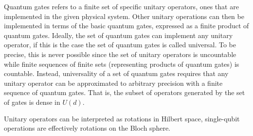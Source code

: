 Quantum gates refers to a finite set of specific unitary operators, ones that are implemented in the given physical system. Other unitary operations can then be implemented in terms of the basic quantum gates, expressed as a finite product of quantum gates. Ideally, the set of quantum gates can implement any unitary operator, if this is the case the set of quantum gates is called universal. To be precise, this is never possible since the set of unitary operators is uncountable while finite sequences of finite sets (representing products of quantum gates) is countable. Instead, universality of a set of quantum gates requires that any unitary operator can be approximated to arbitrary precision with a finite sequence of quantum gates. That is, the subset of operators generated by the set of gates is dense in $U(d)$.

Unitary operators can be interpreted as rotations in Hilbert space, single-qubit operations are effectively rotations on the Bloch sphere.


